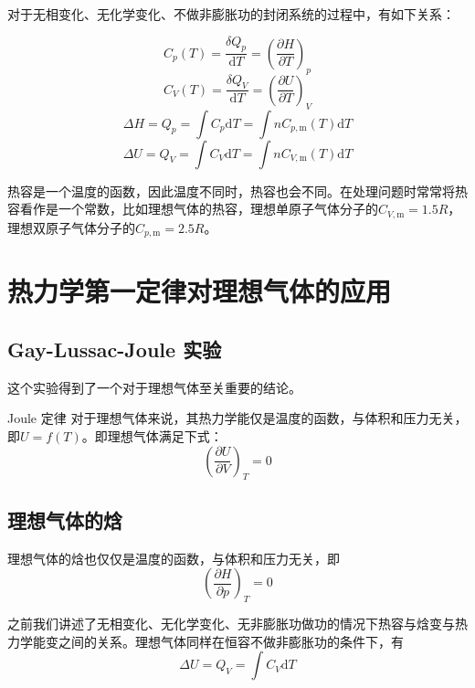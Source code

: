 \documentclass[lang=cn,newtx,10pt,scheme=chinese]{elegantbook}
\begin{document}
对于无相变化、无化学变化、不做非膨胀功的封闭系统的过程中，有如下关系：

\begin{equation}
	C_p(T)=\frac{ \delta Q_p }{\mathrm{d}T } =\left ( \frac{\partial H}{\partial T}  \right )_p
\end{equation}
\begin{equation}
	C_V(T)=\frac{ \delta Q_V }{\mathrm{d}T } =\left ( \frac{\partial U}{\partial T}  \right )_V
\end{equation}
\begin{equation}
	\Delta H=Q_p=\int C_p\mathrm{d}T=\int nC_{p,\mathrm{m} }(T)\mathrm{d}T 
\end{equation}
\begin{equation}
	\Delta U=Q_V=\int C_V\mathrm{d}T=\int nC_{V,\mathrm{m} }(T)\mathrm{d}T 
\end{equation}

热容是一个温度的函数，因此温度不同时，热容也会不同。在处理问题时常常将热容看作是一个常数，比如理想气体的热容，理想单原子气体分子的$C_{V,\mathrm{m}}=1.5R$，理想双原子气体分子的$C_{p,\mathrm{m}}=2.5R$。

\section{热力学第一定律对理想气体的应用}
\subsection{Gay-Lussac-Joule 实验}
这个实验得到了一个对于理想气体至关重要的结论。
\begin{theorem}{Joule 定律}
	对于理想气体来说，其热力学能仅是温度的函数，与体积和压力无关，即$U=f(T)$。即理想气体满足下式：
	\begin{equation}
		\left ( \frac{\partial U}{\partial V}  \right )_T=0
	\end{equation}
\end{theorem}

\subsection{理想气体的焓}
理想气体的焓也仅仅是温度的函数，与体积和压力无关，即
\begin{equation}
	\left ( \frac{\partial H}{\partial p}  \right )_T=0
\end{equation}

之前我们讲述了无相变化、无化学变化、无非膨胀功做功的情况下热容与焓变与热力学能变之间的关系。理想气体同样在恒容不做非膨胀功的条件下，有
\begin{equation}
	\Delta U=Q_V=\int C_V \mathrm{d}T
\end{equation}
\end{document}
